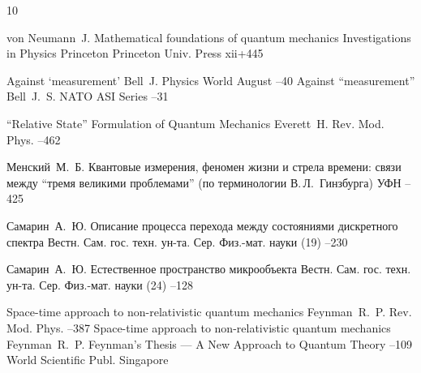 \begin{thebibliography}{10}


\by von Neumann~J.
\book Mathematical foundations of quantum mechanics
\serial Investigations in Physics 
\publ Princeton
\publaddr Princeton Univ. Press
\totalpages xii+445 

\paper Against `measurement'
\by Bell~J.
\jour Physics World
\issueinfo August
--40
\moreref
\paper Against ``measurement''
\by Bell~J.~S.
\jour NATO ASI Series 
--31


\paper ``Relative State'' Formulation of Quantum Mechanics
\by Everett~H.
\jour Rev. Mod. Phys.
--462 


\by Менский~М.~Б.
\paper Квантовые измерения, феномен жизни и стрела времени: связи между ``тремя великими проблемами'' (по терминологии В.\,Л.~Гинзбурга)
\jour УФН
--425



\by Самарин~А.~Ю.
\paper Описание процесса перехода между состояниями дискретного спектра
\jour Вестн. Сам. гос. техн. ун-та. Сер. Физ.-мат. науки
(19)
--230


\by Самарин~А.~Ю.
\paper Естественное пространство микрообъекта
\jour Вестн. Сам. гос. техн. ун-та. Сер. Физ.-мат. науки
(24)
--128

\paper Space-time approach to non-relativistic quantum mechanics
\by Feynman~R.~P.
\jour Rev. Mod. Phys.
--387
\moreref
\paper Space-time approach to non-relativistic quantum mechanics
\by Feynman~R.~P.
\inbook  Feynman's Thesis — A New Approach to Quantum Theory
--109
\publ World Scientific Publ.
\publaddr Singapore


\end{thebibliography}
